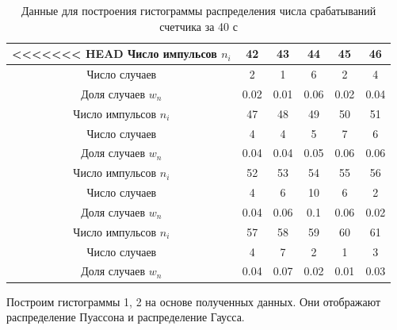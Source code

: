 \documentclass[a4paper,12pt]{article}
\begin{document}
\begin{table}[H]
\centering
\caption{Данные для построения гистограммы распределения числа срабатываний счетчика за 40 с} \label{40c}
\begin{tabular}{|c|c|c|c|c|c|}
<<<<<<< HEAD
\hline
Число импульсов $n_i$ & 42 & 43 & 44 & 45 & 46\\
\hline
Число случаев & 2 & 1 & 6 & 2 & 4 \\
\hline
Доля случаев $w_n$ & 0.02 & 0.01 & 0.06 & 0.02 & 0.04 \\
\hline
\hline
Число импульсов $n_i$ & 47 & 48 & 49 & 50 & 51\\
\hline
Число случаев & 4 & 4 & 5 & 7 & 6 \\
\hline
Доля случаев $w_n$ & 0.04 & 0.04 & 0.05 & 0.06 & 0.06 \\
\hline
\hline
Число импульсов $n_i$ & 52 & 53 & 54 & 55 & 56\\
\hline
Число случаев & 4 & 6 & 10 & 6 & 2 \\
\hline
Доля случаев $w_n$ & 0.04 & 0.06 & 0.1 & 0.06 & 0.02 \\
\hline
\hline
Число импульсов $n_i$ & 57 & 58 & 59 & 60 & 61\\
\hline
Число случаев & 4 & 7 & 2 & 1 & 3 \\
\hline
Доля случаев $w_n$ & 0.04 & 0.07 & 0.02 & 0.01 & 0.03 \\

\hline

\end{tabular}
\end{table}

Построим гистограммы 1, 2 на основе полученных данных. Они отображают распределение Пуассона и распределение Гаусса.
\end{document}
